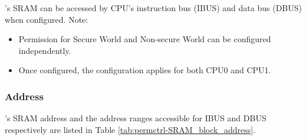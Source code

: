 \documentclass[main\_\_EN.tex]{subfiles}
\begin{document}
\chipname{}'s SRAM can be accessed by CPU's instruction bus (IBUS) and data bus (DBUS) when configured. Note:
\begin{itemize}
    \item Permission for Secure World and Non-secure World can be configured independently.
    \item Once configured, the configuration applies for both CPU0 and CPU1.
\end{itemize}

\subsubsection{Address}

\chipname{}'s SRAM address and the address ranges accessible for IBUS and DBUS respectively are listed in Table  \ref{tab:permctrl-SRAM_block_address}.
\end{document}
